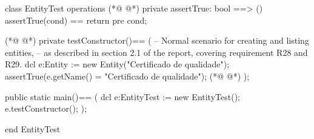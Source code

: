 \begin{vdmpp}[breaklines=true]
class EntityTest
 operations
(*@
\label{assertTrue:3}
@*)
  private assertTrue: bool ==> ()
    assertTrue(cond) == return
    pre cond;
    
(*@
\label{testConstructor:7}
@*)
  private testConstructor()==
  (
    -- Normal scenario for creating and listing entities,
     -- as described in section 2.1 of the report, covering requirement R28 and R29.
   dcl e:Entity := new Entity("Certificado de qualidade");
   assertTrue(e.getName() = "Certificado de qualidade");
(*@
\label{main:13}
@*)
  );
  
  public static main()==
    (
   dcl e:EntityTest := new EntityTest();
   e.testConstructor();
    );
     
end EntityTest
\end{vdmpp}
